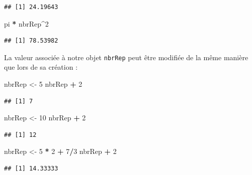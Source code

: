 \documentclass[
]{book}
\newenvironment{Shaded}{\begin{snugshade}}{\end{snugshade}}
\newcommand{\DecValTok}[1]{\textcolor[rgb]{0.00,0.00,0.81}{#1}}
\newcommand{\NormalTok}[1]{#1}
\newcommand{\OperatorTok}[1]{\textcolor[rgb]{0.81,0.36,0.00}{\textbf{#1}}}
\newcommand{\StringTok}[1]{\textcolor[rgb]{0.31,0.60,0.02}{#1}}
\begin{document}
\begin{verbatim}
## [1] 24.19643
\end{verbatim}

\begin{Shaded}
\begin{Highlighting}[]
\NormalTok{pi }\OperatorTok{*}\StringTok{ }\NormalTok{nbrRep}\OperatorTok{^}\DecValTok{2}
\end{Highlighting}
\end{Shaded}

\begin{verbatim}
## [1] 78.53982
\end{verbatim}

La valeur associée à notre objet \texttt{nbrRep} peut être modifiée de la même manière que lors de sa création :

\begin{Shaded}
\begin{Highlighting}[]
\NormalTok{nbrRep <-}\StringTok{ }\DecValTok{5}
\NormalTok{nbrRep }\OperatorTok{+}\StringTok{ }\DecValTok{2}
\end{Highlighting}
\end{Shaded}

\begin{verbatim}
## [1] 7
\end{verbatim}

\begin{Shaded}
\begin{Highlighting}[]
\NormalTok{nbrRep <-}\StringTok{ }\DecValTok{10}
\NormalTok{nbrRep }\OperatorTok{+}\StringTok{ }\DecValTok{2}
\end{Highlighting}
\end{Shaded}

\begin{verbatim}
## [1] 12
\end{verbatim}

\begin{Shaded}
\begin{Highlighting}[]
\NormalTok{nbrRep <-}\StringTok{ }\DecValTok{5} \OperatorTok{*}\StringTok{ }\DecValTok{2} \OperatorTok{+}\StringTok{ }\DecValTok{7}\OperatorTok{/}\DecValTok{3}
\NormalTok{nbrRep }\OperatorTok{+}\StringTok{ }\DecValTok{2}
\end{Highlighting}
\end{Shaded}

\begin{verbatim}
## [1] 14.33333
\end{verbatim}
\end{document}
